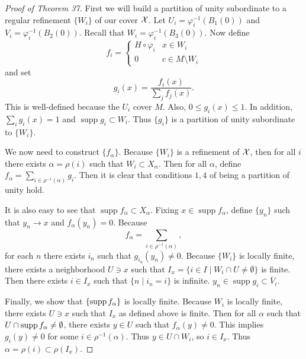 \documentclass[twoside, 10pt]{article}
\begin{document}
    \begin{proof}[Proof of Theorem 37] First we will build a partition of unity
        subordinate to a regular refinement $\{W_i\}$ of our cover $\mathcal{X}$.
        Let $U_i = \varphi_i^{-1}(B_1(0))$ and $V_i = \varphi_i^{-1}(B_2(0))$.
        Recall that $W_i = \varphi_i^{-1}(B_3(0))$. Now define \[f_i =
            \begin{cases} H \circ \varphi_i & x \in W_i \\ 0 & c \in M
                \setminus W_i \end{cases} \] and set \[g_i(x) =
            \frac{f_i(x)}{\sum_j f_j(x)}.\] This is well-defined because the
            $U_i$ cover $M$. Also, $0 \leq g_i(x) \leq 1$. In addition, $\sum_i
            g_i(x) = 1$ and $\operatorname{supp} g_i \subset W_i$. Thus
            $\{g_i\}$ is a partition of unity subordinate to $\{W_i\}$.

        We now need to construct $\{f_{\alpha}\}$. Because $\{W_i\}$ is a
        refinement of $\mathcal{X}$, then for all $i$ there exists $\alpha =
        \rho(i)$ such that $W_i \subset X_{\alpha}$. Then for all $\alpha$,
        define $f_{\alpha} = \sum_{i \in \rho^{-1}(\alpha)} g_i$. Then it is
        clear that conditions $1,4$ of being a partition of unity hold. 
        
        It is also easy to see that $\operatorname{supp} f_{\alpha} \subset
        X_{\alpha}$. Fixing $x \in \operatorname{supp} f_{\alpha}$, define
        $\{y_n\}$ such that $y_n \to x$ and $f_{\alpha}(y_n) = 0$. Because
        \[f_{\alpha} = \sum_{i\in \rho^{-1}(\alpha)},\] for each $n$ there
        exists $i_n$ such that $g_{i_n}(y_n) \neq 0$. Because $\{W_i\}$ is
        locally finite, there exists a neighborhood $U \ni x$ such that $I_x =
        \{i \in I \mid W_i \cap U \neq \emptyset\}$ is finite. Then there
        exists $i \in I_x$ such that $\{n \mid i_n = i\}$ is infinite. $y_n \in
        \operatorname{supp} g_i \subset \overline{V}_i$. 

        Finally, we show that $\{\operatorname{supp} f_{\alpha}\}$ is locally finite. Because
    $W_i$ is locally finite, there exists $U \ni x$ such that $I_x$ as defined
above is finite. Then for all $\alpha$ such that $U \cap \operatorname{supp} f_{\alpha} \neq
\emptyset$, there exists $y \in U$ such that $f_{\alpha}(y) \neq 0$. This
implies $g_i(y) \neq 0$ for some $i \in \rho^{-1}(\alpha)$. Thus $y \in U \cap
W_i$, so $i \in I_x$. Thus $\alpha = \rho(i) \subset \rho(I_x)$.  \end{proof}
\end{document}
